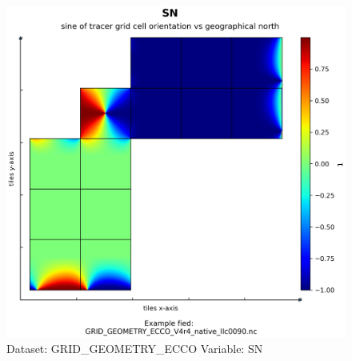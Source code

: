 \begin{figure}[H]
\centering
\includegraphics[scale=0.55]{../images/plots/native_plots_coords/Geometry_Parameters_for_the_Lat-Lon-Cap_90_(llc90)_Native_Model_Grid_(Version_4_Release_4)/SN.png}
\caption{Dataset: GRID\_GEOMETRY\_ECCO Variable: SN}
\label{tab:table-GRID_GEOMETRY_ECCO_SN-Plot}
\end{figure}
\pagebreak
